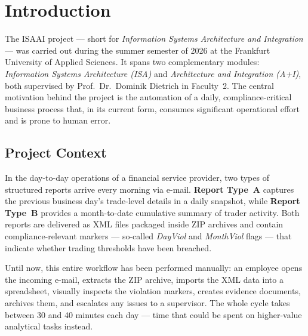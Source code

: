 \documentclass[11pt,a4paper]{article}
\begin{document}
\newpage


\tableofcontents
\newpage



\section{Introduction}

The ISAAI project --- short for \emph{Information Systems Architecture and Integration} --- was carried out during the summer semester of 2026 at the Frankfurt University of Applied Sciences. It spans two complementary modules: \emph{Information Systems Architecture (ISA)} and \emph{Architecture and Integration (A+I)}, both supervised by Prof.~Dr.~Dominik Dietrich in Faculty~2. The central motivation behind the project is the automation of a daily, compliance-critical business process that, in its current form, consumes significant operational effort and is prone to human error.

\subsection{Project Context}

In the day-to-day operations of a financial service provider, two types of structured reports arrive every morning via e-mail. \textbf{Report Type~A} captures the previous business day's trade-level details in a daily snapshot, while \textbf{Report Type~B} provides a month-to-date cumulative summary of trader activity. Both reports are delivered as XML files packaged inside ZIP archives and contain compliance-relevant markers --- so-called \emph{DayViol} and \emph{MonthViol} flags --- that indicate whether trading thresholds have been breached.

Until now, this entire workflow has been performed manually: an employee opens the incoming e-mail, extracts the ZIP archive, imports the XML data into a spreadsheet, visually inspects the violation markers, creates evidence documents, archives them, and escalates any issues to a supervisor. The whole cycle takes between 30 and 40 minutes each day --- time that could be spent on higher-value analytical tasks instead.
\end{document}
